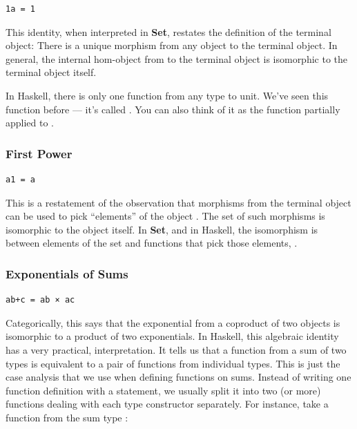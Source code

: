 \begin{verbatim}
1a = 1
\end{verbatim}

This identity, when interpreted in \textbf{Set}, restates the definition
of the terminal object: There is a unique morphism from any object to
the terminal object. In general, the internal hom-object from 
to the terminal object is isomorphic to the terminal object itself.

In Haskell, there is only one function from any type  to unit.
We've seen this function before --- it's called . You can
also think of it as the function  partially applied to
\code{()}.

\subsubsection{First Power}\label{first-power}

\begin{verbatim}
a1 = a
\end{verbatim}

This is a restatement of the observation that morphisms from the
terminal object can be used to pick ``elements'' of the object
. The set of such morphisms is isomorphic to the object
itself. In \textbf{Set}, and in Haskell, the isomorphism is between
elements of the set  and functions that pick those elements,
.

\subsubsection{Exponentials of Sums}\label{exponentials-of-sums}

\begin{verbatim}
ab+c = ab × ac
\end{verbatim}

Categorically, this says that the exponential from a coproduct of two
objects is isomorphic to a product of two exponentials. In Haskell, this
algebraic identity has a very practical, interpretation. It tells us
that a function from a sum of two types is equivalent to a pair of
functions from individual types. This is just the case analysis that we
use when defining functions on sums. Instead of writing one function
definition with a  statement, we usually split it into two
(or more) functions dealing with each type constructor separately. For
instance, take a function from the sum type
:

